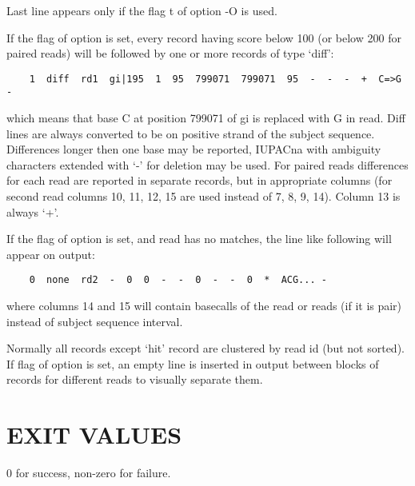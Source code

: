 \documentclass[english,letter]{article}
\begin{document}
    Last line appears only if the flag t of option -O is used.

    If the flag  of option  is set, every record having score below 100 (or
    below 200 for paired reads) will be followed by one or more records of
    type `diff':

	\begin{verbatim}
    1  diff  rd1  gi|195  1  95  799071  799071  95  -  -  -  +  C=>G  -
	\end{verbatim}

    which means that base C at position 799071 of gi is replaced with G in
    read. Diff lines are always converted to be on positive strand of the
    subject sequence.  Differences longer then one base may be reported,
    IUPACna with ambiguity characters extended with `-' for deletion may be
    used. For paired reads differences for each read are reported in separate
    records, but in appropriate columns (for second read columns 10, 11, 12, 15
    are used instead of 7, 8, 9, 14). Column 13 is always `+'.

    If the flag  of option  is set, and read has no matches, the line like
    following will appear on output:

	\begin{verbatim}
    0  none  rd2  -  0  0  -  -  0  -  -  0  *  ACG... -
	\end{verbatim}

    where columns 14 and 15 will contain basecalls of the read or reads (if it
    is pair) instead of subject sequence interval.

    Normally all records except `hit' record are clustered by read id (but not
    sorted). If flag  of option  is set, an empty line is inserted in
    output between blocks of records for different reads to visually separate
    them.

\section{EXIT VALUES}
    0 for success, non-zero for failure.

\LatexManEnd
\end{document}
